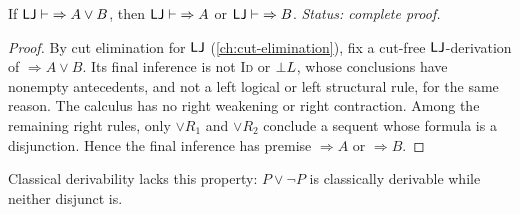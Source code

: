\begin{theorem}
\label{thm:disjunction-property}
If \(\mathsf{LJ}\vdash\;\Rightarrow A\lor B\), then
\(\mathsf{LJ}\vdash\;\Rightarrow A\) or \(\mathsf{LJ}\vdash\;\Rightarrow B\).
\textit{Status: complete proof.}
\end{theorem}

\begin{proof}
By cut elimination for \(\mathsf{LJ}\) (\cref{ch:cut-elimination}), fix a
cut-free \(\mathsf{LJ}\)-derivation of \(\Rightarrow A\lor B\).  Its final
inference is not \textsc{Id} or \(\bot L\), whose conclusions have
nonempty antecedents, and not a left logical or left structural rule, for
the same reason.  The calculus has no right weakening or right contraction.
Among the remaining right rules, only \(\lor R_1\) and \(\lor R_2\)
conclude a sequent whose formula is a disjunction.  Hence the final
inference has premise \(\Rightarrow A\) or \(\Rightarrow B\).
\end{proof}

Classical derivability lacks this property: \(P\lor\neg P\) is
classically derivable while neither disjunct is.

